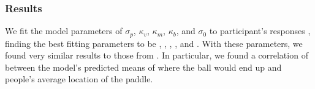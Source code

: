 \documentclass[10pt,letterpaper]{article}
\begin{document}
\subsubsection{Results}

We fit the model parameters of $\sigma_p$, $\kappa_v$, $\kappa_m$, $\kappa_b$, and $\sigma_0$ to participant's responses \cite<for details, see>{Smith:2013fc}, finding the best fitting parameters to be \perr{}, \kapv{}, \kapm{}, \kapb{}, and \sdzero{}.
With these parameters, we found very similar results to those from .
In particular, we found a correlation of \PaddleCorr{} between the model's predicted means of where the ball would end up and people's average location of the paddle.


\renewcommand{\bibliographytypesize}{\small}
\setlength{\bibleftmargin}{.125in}
\setlength{\bibindent}{-\bibleftmargin}

\end{document}

